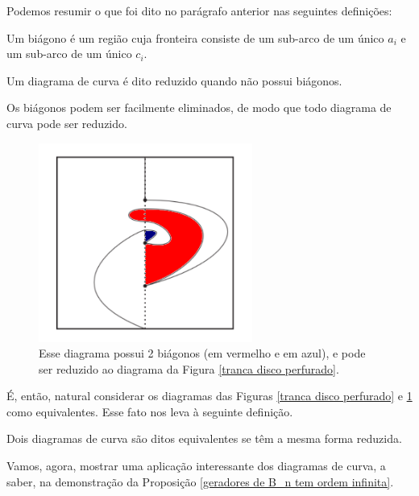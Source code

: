 	\par\vspace{0.3cm} Podemos resumir o que foi dito no parágrafo anterior nas seguintes definições:
	\begin{definition}[Biágono]
	\label{def biagono}
		Um biágono é um região cuja fronteira consiste de um sub-arco de um único $a_i$ e um 
		sub-arco de um único $c_i$.
	\end{definition}
	\begin{definition}
	\label{def reducao}
		Um diagrama de curva é dito reduzido quando não possui biágonos.
	\end{definition}
	Os biágonos podem ser facilmente eliminados, de modo que todo diagrama de curva pode ser reduzido. 
	\begin{figure}[H]
	\begin{center}
		\includegraphics[width=7cm]{Images/biagonos.png}
	\end{center}\caption{Esse diagrama possui 2 biágonos (em vermelho e em azul), e 
	pode ser reduzido ao diagrama da Figura \ref{tranca disco perfurado}.}
	\label{diagrama nao reduzido com biagonos}
	\end{figure}
	É, então, natural considerar os diagramas das 
	Figuras \ref{tranca disco perfurado} e \ref{diagrama nao reduzido com biagonos} como equivalentes. 
	Esse fato nos leva à seguinte definição.
	\begin{definition}
	\label{def equivalencia diagramas}
		Dois diagramas de curva são ditos equivalentes se têm a mesma forma reduzida.
	\end{definition} 
	Vamos, agora, mostrar uma aplicação interessante dos diagramas de curva, a saber, na demonstração da Proposição \ref{geradores de B_n tem ordem infinita}.
	
